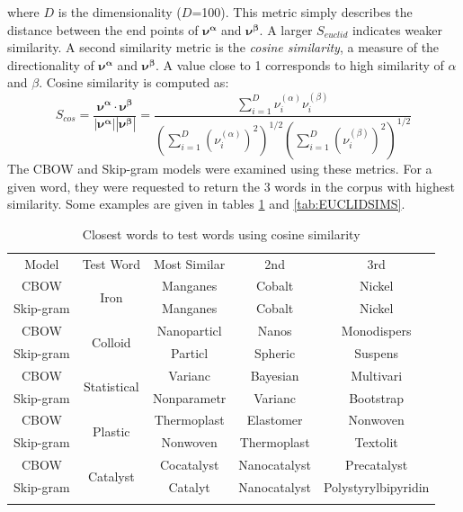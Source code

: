 where $D$ is the dimensionality ($D$=100). This metric simply describes the distance between the end points of $\mathbf{\nu^\alpha}$ and $\mathbf{\nu^\beta}$. A larger $S_{euclid}$ indicates weaker similarity. A second similarity metric is the \emph{cosine similarity}, a measure of the directionality of $\mathbf{\nu^\alpha}$ and $\mathbf{\nu^\beta}$. A value close to 1 corresponds to high similarity of $\alpha$ and $\beta$. Cosine similarity is computed as:
$$S_{cos}=\frac{\mathbf{\nu^\alpha} \cdot \mathbf{\nu^\beta}}{|\mathbf{\nu^\alpha}| |\mathbf{\nu^\beta}|} = \frac{\displaystyle\sum_{i=1}^{D} \nu^{(\alpha)}_{i}\nu^{(\beta)}_{i}}{\left(\displaystyle\sum_{i=1}^{D} (\nu^{(\alpha)}_{i})^2\right)^{1/2} \left(\displaystyle\sum_{i=1}^{D} (\nu^{(\beta)}_{i})^2\right)^{1/2}}
$$
The CBOW and Skip-gram models were examined using these metrics. For a given word, they were requested to return the 3 words in the corpus with highest similarity. Some examples are given in tables \ref{tab:COSINESIMS} and \ref{tab:EUCLIDSIMS}.
\begin{table}[h!]
\begin{center}
\caption{Closest words to test words using cosine similarity}
\label{tab:COSINESIMS}
\begin{tabular}{||c||c|c|c|c||}
\hline
Model     & Test Word              & Most Similar & 2nd & 3rd \\ \hhline{||=||=|=|=|=||}
CBOW      & \multirow{2}{*}{Iron} & Manganes             &  Cobalt   &   Nickel  \\ \cline{1-1} \cline{3-5} 
Skip-gram &                   &  Manganes            &   Cobalt  &  Nickel   \\ 
\hhline{||=||=|=|=|=||}
CBOW      & \multirow{2}{*}{Colloid} & Nanoparticl             &  Nanos   &   Monodispers  \\ \cline{1-1} \cline{3-5} 
Skip-gram &                   &  Particl            &   Spheric  &  Suspens   \\ 
\hhline{||=||=|=|=|=||}
CBOW      & \multirow{2}{*}{Statistical} & Varianc             &  Bayesian   &   Multivari  \\ \cline{1-1} \cline{3-5} 
Skip-gram &                   &  Nonparametr            &   Varianc  &  Bootstrap   \\ 
\hhline{||=||=|=|=|=||}
CBOW      & \multirow{2}{*}{Plastic} & Thermoplast             &  Elastomer   & Nonwoven    \\ \cline{1-1} \cline{3-5} 
Skip-gram &                   &  Nonwoven            &   Thermoplast  &  Textolit   \\ 
\hhline{||=||=|=|=|=||}
CBOW      & \multirow{2}{*}{Catalyst} & Cocatalyst             &  Nanocatalyst   & Precatalyst    \\ \cline{1-1} \cline{3-5} 
Skip-gram &                   &  Catalyt            &   Nanocatalyst  &  Polystyrylbipyridin   \\ 
\hhline{||=||=|=|=|=||}
\end{tabular}
\end{center}
\end{table}


